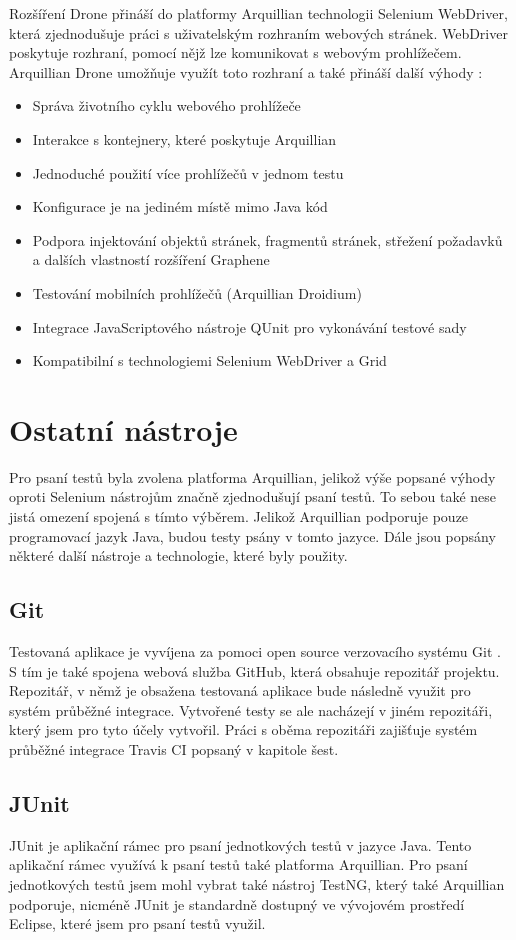 \documentclass[
    color,   %
	table,   %
    twoside, %
]{fithesis3}
\begin{document}
Rozšíření Drone přináší do platformy Arquillian technologii Selenium WebDriver, která zjednodušuje práci s uživatelským rozhraním webových stránek. WebDriver poskytuje rozhraní, pomocí nějž lze komunikovat s webovým prohlížečem. Arquillian Drone umožňuje využít toto rozhraní a také přináší další výhody \cite{Drone}:
\begin{itemize}
\item Správa životního cyklu webového prohlížeče
\item Interakce s kontejnery, které poskytuje Arquillian
\item Jednoduché použití více prohlížečů v jednom testu
\item Konfigurace je na jediném místě mimo Java kód
\item Podpora injektování objektů stránek, fragmentů stránek, střežení požadavků a dalších vlastností rozšíření Graphene
\item Testování mobilních prohlížečů (Arquillian Droidium)
\item Integrace JavaScriptového nástroje QUnit pro vykonávání testové sady
\item Kompatibilní s technologiemi Selenium WebDriver a Grid
\end{itemize}

\section{Ostatní nástroje}
Pro psaní testů byla zvolena platforma Arquillian, jelikož výše popsané výhody oproti Selenium nástrojům značně zjednodušují psaní testů. To sebou také nese jistá omezení spojená s tímto výběrem. Jelikož Arquillian podporuje pouze programovací jazyk Java, budou testy psány v tomto jazyce. Dále jsou popsány některé další nástroje a technologie, které byly použity.
\subsection{Git}
Testovaná aplikace je vyvíjena za pomoci open source verzovacího systému Git \cite{Git}. S tím je také spojena webová služba GitHub, která obsahuje repozitář projektu. Repozitář, v němž je obsažena testovaná aplikace bude následně využit pro systém průběžné integrace. Vytvořené testy se ale nacházejí v jiném repozitáři, který jsem pro tyto účely vytvořil. Práci s oběma repozitáři zajišťuje systém průběžné integrace Travis CI popsaný v kapitole šest.
\subsection{JUnit}
JUnit \cite{JUnit} je aplikační rámec pro psaní jednotkových testů v jazyce Java. Tento aplikační rámec využívá k psaní testů také platforma Arquillian. Pro psaní jednotkových testů jsem mohl vybrat také nástroj TestNG, který také Arquillian podporuje, nicméně JUnit je standardně dostupný ve vývojovém prostředí Eclipse, které jsem pro psaní testů využil.
\end{document}
